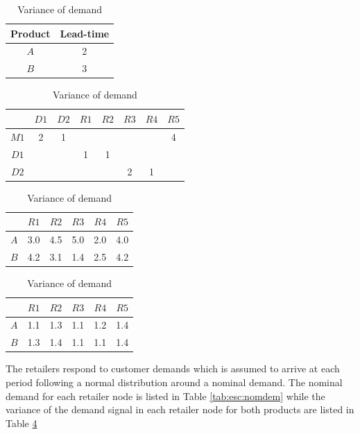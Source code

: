 \begin{table}
\caption{Production lead-times}
\label{tab:esc:prodlead}
\begin{center}
\begin{tabular}{cc}\toprule
Product& Lead-time \\
\midrule
$A$ & 2\\
$B$ & 3\\
\bottomrule
\end{tabular}
\end{center}
\caption{Transportation lead-times}
\label{tab:esc:translead}
\begin{center}
\begin{tabular}{cccccccc}\toprule
& $D1$ & $D2$  & $R1$ & $R2$ & $R3$ & $R4$ & $R5$ \\
\midrule
$M1$ &2&1& & & & &4\\
$D1$ & & &1&1& & & \\
$D2$ & & & & &2&1& \\
\bottomrule
\end{tabular}
\end{center}
\caption{Nominal demand}
\begin{center}
\begin{tabular}{cccccc}\toprule
\label{tab:esc:nomdem}
 &$R1$&$R2$&$R3$&$R4$&$R5$\\
\midrule
$A$&3.0&4.5&5.0&2.0&4.0\\
$B$&4.2&3.1&1.4&2.5&4.2\\
\bottomrule
\end{tabular}
\end{center}
\caption{Variance of  demand}
\begin{center}
\begin{tabular}{cccccc}\toprule
\label{tab:esc:vardem}
 &$R1$&$R2$&$R3$&$R4$&$R5$\\
\midrule
$A$&1.1&1.3&1.1&1.2&1.4\\
$B$&1.3&1.4&1.1&1.1&1.4\\
\bottomrule
\end{tabular}
\end{center}
\end{table}




The retailers respond to customer demands which is assumed to arrive
at each period following a normal distribution around a nominal
demand. The nominal demand for each retailer node is listed in Table
\ref{tab:esc:nomdem} while the variance of the demand signal in each retailer node for
both products are listed in Table \ref{tab:esc:vardem}


